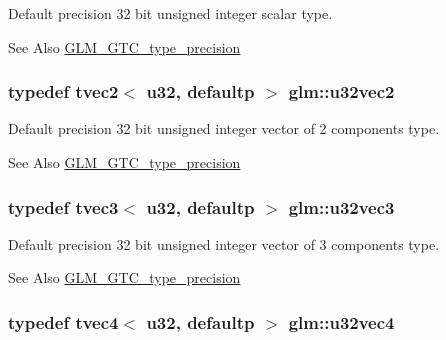 Default precision 32 bit unsigned integer scalar type. \begin{DoxySeeAlso}{See Also}
\hyperlink{group__gtc__type__precision}{G\-L\-M\-\_\-\-G\-T\-C\-\_\-type\-\_\-precision} 
\end{DoxySeeAlso}
\hypertarget{group__gtc__type__precision_gad3a81c0d5a6941bb9ffdc9fa8611b426}{
\subsubsection[{u32vec2}]{\setlength{\rightskip}{0pt plus 5cm}typedef tvec2$<$ u32, defaultp $>$ {\bf glm\-::u32vec2}}}\label{group__gtc__type__precision_gad3a81c0d5a6941bb9ffdc9fa8611b426}
Default precision 32 bit unsigned integer vector of 2 components type. \begin{DoxySeeAlso}{See Also}
\hyperlink{group__gtc__type__precision}{G\-L\-M\-\_\-\-G\-T\-C\-\_\-type\-\_\-precision} 
\end{DoxySeeAlso}
\hypertarget{group__gtc__type__precision_ga16b26751ba6b83c8a0226b9834d73fdc}{
\subsubsection[{u32vec3}]{\setlength{\rightskip}{0pt plus 5cm}typedef tvec3$<$ u32, defaultp $>$ {\bf glm\-::u32vec3}}}\label{group__gtc__type__precision_ga16b26751ba6b83c8a0226b9834d73fdc}
Default precision 32 bit unsigned integer vector of 3 components type. \begin{DoxySeeAlso}{See Also}
\hyperlink{group__gtc__type__precision}{G\-L\-M\-\_\-\-G\-T\-C\-\_\-type\-\_\-precision} 
\end{DoxySeeAlso}
\hypertarget{group__gtc__type__precision_ga6e966cda0025699449a36b41f1787927}{
\subsubsection[{u32vec4}]{\setlength{\rightskip}{0pt plus 5cm}typedef tvec4$<$ u32, defaultp $>$ {\bf glm\-::u32vec4}}}\label{group__gtc__type__precision_ga6e966cda0025699449a36b41f1787927}
